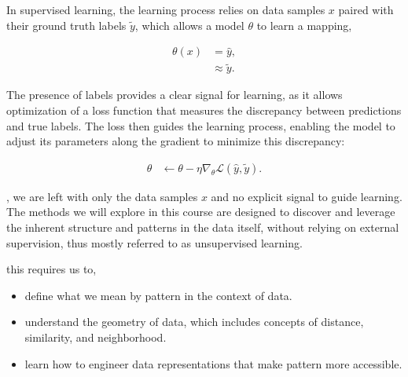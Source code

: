 In supervised learning\cite{DeepLearningBook}, the learning process relies on data samples $x$ paired with their ground truth labels $\tilde{y}$, which allows a
model $\theta$ to learn a mapping,


\begin{align*}
    \theta(x) &= \hat{y},\\
                &\approx \tilde{y}.
\end{align*}


The presence of labels provides a clear signal for learning, as it allows optimization of a loss function that measures the discrepancy between predictions and true labels.
The loss then guides the learning process, enabling the model to adjust its parameters along the gradient to minimize this discrepancy:

\begin{align*}
    \theta &\leftarrow \theta - \eta \nabla_\theta \mathcal{L}(\hat{y}, \tilde{y}).
\end{align*}

, we are left with only the data samples\cite{DIKWpyramid} $x$ and no explicit signal to guide learning.
The methods we will explore in this course are designed to discover and leverage the inherent structure and patterns\cite{Bishop2006} in the data itself, 
without relying on external supervision, thus mostly referred to as unsupervised learning.


 this requires us to,
\begin{itemize}
    \item define what we mean by pattern in the context of data.
    \item understand the geometry of data, which includes concepts of distance, similarity, and neighborhood.
    \item learn how to engineer data representations that make pattern more accessible.
\end{itemize}

